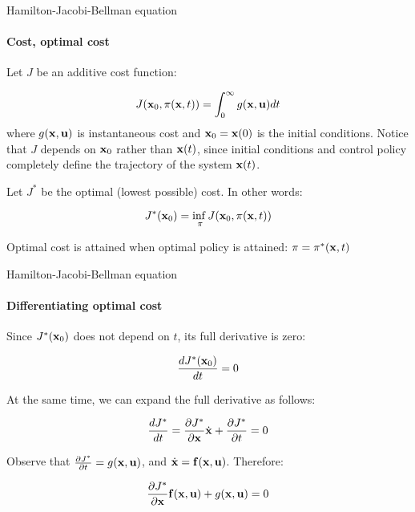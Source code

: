 \documentclass{beamer}
\begin{document}
\begin{frame}{Hamilton-Jacobi-Bellman equation}
\framesubtitle{Cost, optimal cost}
\begin{flushleft}

Let $J$ be an additive cost function:

\begin{equation}
J (\mathbf{x}_0, \pi (\mathbf{x}, t)) = \int_0^\infty g(\mathbf{x}, \mathbf{u}) dt
\end{equation}
%
where $g(\mathbf{x}, \mathbf{u})$ is instantaneous cost and $\mathbf{x}_0 = \mathbf{x}(0)$ is the initial conditions. Notice that $J$ depends on $\mathbf{x}_0$ rather than $\mathbf{x}(t)$, since initial conditions and control policy completely define the trajectory of the system $\mathbf{x}(t)$.


\bigskip

Let $J^*$ be the optimal (lowest possible) cost. In other words:

\begin{equation}
J^*(\mathbf{x}_0) = \underset{\pi}{\inf{}} J(\mathbf{x}_0, \pi (\mathbf{x}, t))
\end{equation}

Optimal cost is attained when optimal policy is attained: $\pi = \pi^*(\mathbf{x}, t)$

\end{flushleft}
\end{frame}





\begin{frame}{Hamilton-Jacobi-Bellman equation}
\framesubtitle{Differentiating optimal cost}
\begin{flushleft}


Since $J^*(\mathbf{x}_0)$ does not depend on $t$, its full derivative is zero:

\begin{equation}
\frac{d J^*(\mathbf{x}_0)}{dt} = 0
\end{equation}

At the same time, we can expand the full derivative as follows:

\begin{equation}
\frac{d J^*}{dt } = 
\frac{\partial J^*}{\partial \mathbf{x}} \dot {\mathbf{x}} +
\frac{\partial J^*}{\partial t} = 0
\end{equation}

\bigskip

Observe that $\frac{\partial J^*}{\partial t} = g(\mathbf{x}, \mathbf{u})$, and $\dot {\mathbf{x}} = \mathbf{f} (\mathbf{x}, \mathbf{u})$. Therefore:

\begin{equation}
\frac{\partial J^*}{\partial \mathbf{x}} \mathbf{f} (\mathbf{x}, \mathbf{u}) +
g(\mathbf{x}, \mathbf{u}) = 0
\end{equation}

\end{flushleft}
\end{frame}
\end{document}
